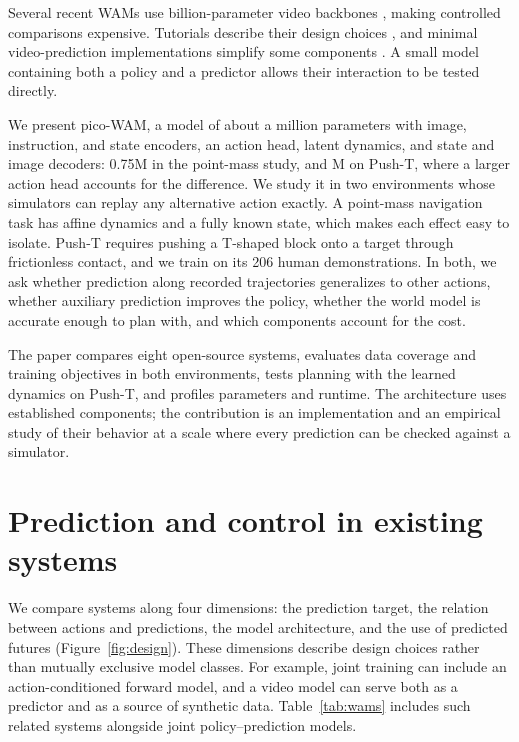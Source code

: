 \documentclass[11pt]{article}
\begin{document}
Several recent WAMs use billion-parameter video backbones \citep{liao2025genie,kim2026cosmospolicy,li2026lingbotva}, making controlled comparisons expensive. Tutorials describe their design choices \citep{zhang2026tutorial}, and minimal video-prediction implementations simplify some components \citep{huang2026nano}. A small model containing both a policy and a predictor allows their interaction to be tested directly.

We present pico-WAM, a model of about a million parameters with image, instruction, and state encoders, an action head, latent dynamics, and state and image decoders: 0.75M in the point-mass study, and \PTfinalParamsWamM M on Push-T, where a larger action head accounts for the difference. We study it in two environments whose simulators can replay any alternative action exactly. A point-mass navigation task has affine dynamics and a fully known state, which makes each effect easy to isolate. Push-T \citep{chi2023diffusion} requires pushing a T-shaped block onto a target through frictionless contact, and we train on its 206 human demonstrations. In both, we ask whether prediction along recorded trajectories generalizes to other actions, whether auxiliary prediction improves the policy, whether the world model is accurate enough to plan with, and which components account for the cost.

The paper compares eight open-source systems, evaluates data coverage and training objectives in both environments, tests planning with the learned dynamics on Push-T, and profiles parameters and runtime. The architecture uses established components; the contribution is an implementation and an empirical study of their behavior at a scale where every prediction can be checked against a simulator.

\section{Prediction and control in existing systems}
\label{sec:design}

We compare systems along four dimensions: the prediction target, the relation between actions and predictions, the model architecture, and the use of predicted futures (Figure~\ref{fig:design}). These dimensions describe design choices rather than mutually exclusive model classes. For example, joint training can include an action-conditioned forward model, and a video model can serve both as a predictor and as a source of synthetic data. Table~\ref{tab:wams} includes such related systems alongside joint policy--prediction models.
\end{document}
